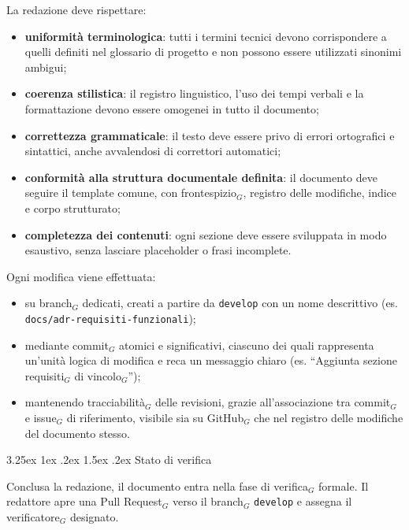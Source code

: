 \documentclass[a4paper, 10pt]{article}
\makeatletter
\renewcommand\paragraph{\@startsection{paragraph}{4}{\z@}%
  {3.25ex \@plus1ex \@minus .2ex}%
  {1.5ex \@plus .2ex}%
  {\normalfont\normalsize\bfseries}}
\makeatother
\begin{document}
La redazione deve rispettare:
\begin{itemize}
    \item \textbf{uniformità terminologica}: tutti i termini tecnici devono corrispondere a quelli definiti nel glossario di progetto e non possono essere utilizzati sinonimi ambigui;
    \item \textbf{coerenza stilistica}: il registro linguistico, l'uso dei tempi verbali e la formattazione devono essere omogenei in tutto il documento;
    \item \textbf{correttezza grammaticale}: il testo deve essere privo di errori ortografici e sintattici, anche avvalendosi di correttori automatici;
    \item \textbf{conformità alla struttura documentale definita}: il documento deve seguire il template comune, con frontespizio$_G$, registro delle modifiche, indice e corpo strutturato;
    \item \textbf{completezza dei contenuti}: ogni sezione deve essere sviluppata in modo esaustivo, senza lasciare placeholder o frasi incomplete.
\end{itemize}

Ogni modifica viene effettuata:
\begin{itemize}
    \item su branch$_G$ dedicati, creati a partire da \texttt{develop} con un nome descrittivo (es. \texttt{docs/adr-requisiti-funzionali});
    \item mediante commit$_G$ atomici e significativi, ciascuno dei quali rappresenta un'unità logica di modifica e reca un messaggio chiaro (es. ``Aggiunta sezione requisiti$_G$ di vincolo$_G$'');
    \item mantenendo tracciabilità$_G$ delle revisioni, grazie all'associazione tra commit$_G$ e issue$_G$ di riferimento, visibile sia su GitHub$_G$ che nel registro delle modifiche del documento stesso.
\end{itemize}

\paragraph{Stato di verifica}

Conclusa la redazione, il documento entra nella fase di verifica$_G$ formale. Il redattore apre una Pull Request$_G$ verso il branch$_G$ \texttt{develop} e assegna il verificatore$_G$ designato.
\end{document}
